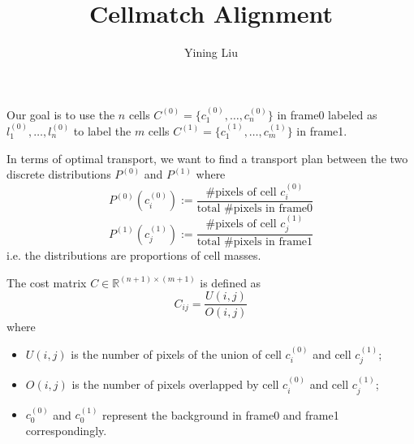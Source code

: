 \documentclass[11pt]{article}
\author{Yining Liu}
\title{Cellmatch Alignment}
\newcommand{\R}{\mathbb{R}}
\theoremstyle{definition}
\begin{document}
 
\maketitle 
Our goal is to use the $n$ cells $C^{(0)} = \{c_1^{(0)}, \dots, c_n^{(0)}\}$ in frame0 labeled as $l_1^{(0)}, \dots, l_n^{(0)}$ to label the $m$ cells $C^{(1)} = \{c_1^{(1)}, \dots, c_m^{(1)}\}$ in frame1. 

In terms of optimal transport, we want to find a transport plan between the two discrete distributions $P^{(0)}$ and $P^{(1)}$ where 
$$P^{(0)}(c_i^{(0)}) := \frac{\text{\# pixels of cell $c_i^{(0)}$}}{ \text{total \# pixels in frame0}}$$
$$P^{(1)}(c_j^{(1)}) := \frac{\text{\# pixels of cell $c_j^{(1)}$}}{ \text{total \# pixels in frame1}}$$ 
i.e. the distributions are proportions of cell masses. 

The cost matrix $C \in \R^{(n+1) \times (m+1)}$ is defined as 
	$$C_{ij} = \frac{U(i, j)}{O(i, j)}$$
	where 
	\begin{itemize}
		\item $U(i, j)$ is the number of pixels of the union of cell $c_i^{(0)}$ and cell $c_j^{(1)}$;
		\item $O(i, j)$ is the number of pixels overlapped by cell $c_i^{(0)}$ and cell $c_j^{(1)}$; 
		\item $c_0^{(0)}$ and $c_0^{(1)}$ represent the background in frame0 and frame1 correspondingly. 
	\end{itemize}
\end{document}
